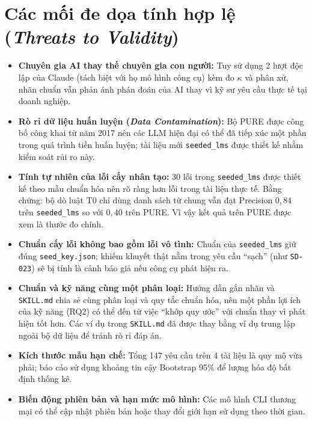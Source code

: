\documentclass[12pt,a4paper]{report}
\begin{document}
\section{Các mối đe dọa tính hợp lệ (\textit{Threats to Validity})}
\begin{itemize}
  \item \textbf{Chuyên gia AI thay thế chuyên gia con người:} Tuy sử dụng 2 lượt độc lập của Claude (tách biệt với họ mô hình công cụ) kèm đo $\kappa$ và phân xử, nhãn chuẩn vẫn phản ánh phán đoán của AI thay vì kỹ sư yêu cầu thực tế tại doanh nghiệp.
  \item \textbf{Rò rỉ dữ liệu huấn luyện (\textit{Data Contamination}):} Bộ PURE được công bố công khai từ năm 2017 nên các LLM hiện đại có thể đã tiếp xúc một phần trong quá trình tiền huấn luyện; tài liệu mới \texttt{seeded\_lms} được thiết kế nhằm kiểm soát rủi ro này.
  \item \textbf{Tính tự nhiên của lỗi cấy nhân tạo:} 30 lỗi trong \texttt{seeded\_lms} được thiết kế theo mẫu chuẩn hóa nên rõ ràng hơn lỗi trong tài liệu thực tế. Bằng chứng: bộ dò luật T0 chỉ dùng danh sách từ chung vẫn đạt Precision $0{,}84$ trên \texttt{seeded\_lms} so với $0{,}40$ trên PURE. Vì vậy kết quả trên PURE được xem là thước đo chính.
  \item \textbf{Chuẩn cấy lỗi không bao gồm lỗi vô tình:} Chuẩn của \texttt{seeded\_lms} giữ đúng \texttt{seed\_key.json}; khiếm khuyết thật nằm trong yêu cầu ``sạch'' (như \texttt{SD-023}) sẽ bị tính là cảnh báo giả nếu công cụ phát hiện ra.
  \item \textbf{Chuẩn và kỹ năng cùng một phân loại:} Hướng dẫn gắn nhãn và \texttt{SKILL.md} chia sẻ cùng phân loại và quy tắc chuẩn hóa, nên một phần lợi ích của kỹ năng (RQ2) có thể đến từ việc ``khớp quy ước'' với chuẩn thay vì phát hiện tốt hơn. Các ví dụ trong \texttt{SKILL.md} đã được thay bằng ví dụ trung lập ngoài bộ dữ liệu để tránh rò rỉ đáp án.
  \item \textbf{Kích thước mẫu hạn chế:} Tổng 147 yêu cầu trên 4 tài liệu là quy mô vừa phải; báo cáo sử dụng khoảng tin cậy Bootstrap 95\% để lượng hóa độ bất định thống kê.
  \item \textbf{Biến động phiên bản và hạn mức mô hình:} Các mô hình CLI thương mại có thể cập nhật phiên bản hoặc thay đổi giới hạn sử dụng theo thời gian.
\end{itemize}

\end{document}
